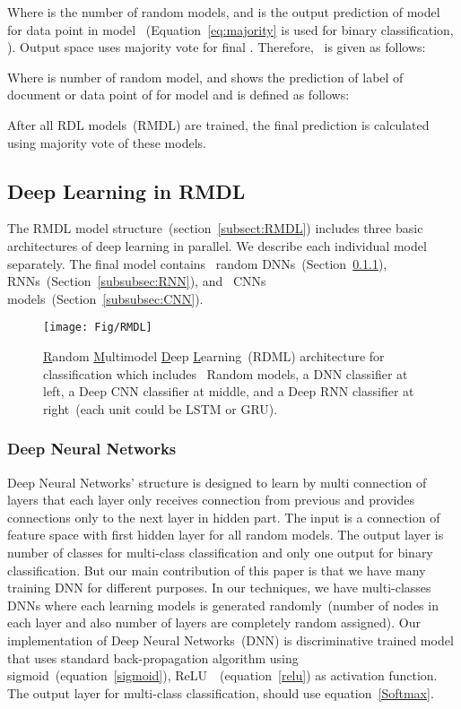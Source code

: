 \documentclass[sigconf, final]{acmart}
\begin{document}
Where  is the number of random models, and  is the output prediction of model for data point  in  model ~(Equation~\ref{eq:majority} is used for binary classification, ). Output space uses majority vote for final . Therefore,~ is given as follows:
 

Where  is number of random model, and  shows the prediction of label of document or data point of  for model  and  is defined as follows:

After all RDL models~(RMDL) are trained, the final prediction is calculated using majority vote of these models. 


\subsection{Deep Learning in RMDL}\label{subsec:Deep_learning}
The RMDL model structure~(section~\ref{subsect:RMDL}) includes three basic architectures of deep learning in parallel. We describe each individual model separately. The final model contains~ random DNNs~(Section~\ref{subsubsec:DNN}),~ RNNs~(Section~\ref{subsubsec:RNN}), and~ CNNs models~(Section~\ref{subsubsec:CNN}).
\begin{figure*}[t]
\centering
\texttt{[image: Fig/RMDL]}
\caption{\underline{R}andom \underline{M}ultimodel \underline{D}eep \underline{L}earning~(RDML) architecture for classification which includes~ Random models, a DNN classifier at left, a Deep CNN classifier at middle, and a Deep RNN classifier at right~(each unit could be LSTM or GRU).}
\vspace{-0.15in}
\label{Fig_RMDL}

\end{figure*}
\subsubsection{Deep Neural Networks}\label{subsubsec:DNN}
Deep Neural Networks' structure is designed to learn by multi connection of layers that each layer only receives connection from previous and provides connections only to the next layer in hidden part. The input is a connection of feature space with first hidden layer for all random models. The output layer is number of classes for multi-class classification and only one output for binary classification. But our main contribution of this paper is that we have many training DNN for different purposes. In our techniques, we have multi-classes DNNs where each learning models is generated randomly~(number of nodes in each layer and also number of layers are completely random assigned). Our implementation of Deep Neural Networks~(DNN) is discriminative trained model that uses standard back-propagation algorithm using sigmoid~(equation~\ref{sigmoid}), ReLU~\cite{nair2010rectified}~(equation~\ref{relu}) as activation function. The output layer for multi-class classification, should use  equation~\ref{Softmax}.
\end{document}
